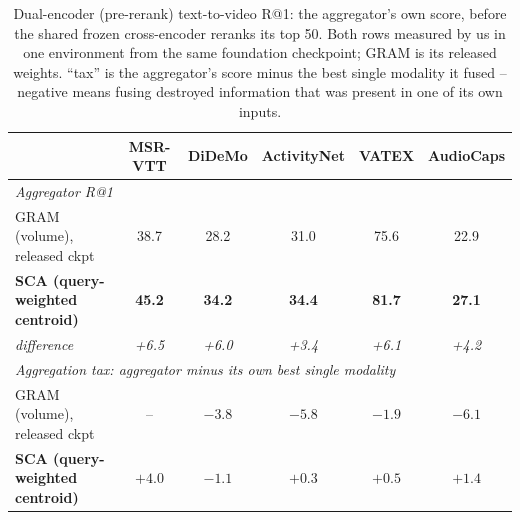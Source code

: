 \begin{table}[t]
\centering
\caption{Dual-encoder (pre-rerank) text-to-video R@1: the aggregator's own score, before the
shared frozen cross-encoder reranks its top 50. Both rows measured by us in one environment
from the same foundation checkpoint; GRAM is its released weights. ``tax'' is the aggregator's
score minus the best single modality it fused -- negative means fusing destroyed information
that was present in one of its own inputs.}
\label{tab:aggregator}
\small
\setlength{\tabcolsep}{5pt}
\begin{tabular}{lccccc}
\toprule
& MSR-VTT & DiDeMo & ActivityNet & VATEX & AudioCaps \\
\midrule
\multicolumn{6}{l}{\emph{Aggregator R@1}} \\
GRAM (volume), released ckpt & 38.7 & 28.2 & 31.0 & 75.6 & 22.9 \\
\textbf{SCA (query-weighted centroid)} & \textbf{45.2} & \textbf{34.2} & \textbf{34.4} & \textbf{81.7} & \textbf{27.1} \\
\emph{difference} & \emph{+6.5} & \emph{+6.0} & \emph{+3.4} & \emph{+6.1} & \emph{+4.2} \\
\midrule
\multicolumn{6}{l}{\emph{Aggregation tax: aggregator minus its own best single modality}} \\
GRAM (volume), released ckpt & -- & $-3.8$ & $-5.8$ & $-1.9$ & $-6.1$ \\
\textbf{SCA (query-weighted centroid)} & $+4.0$ & $-1.1$ & $+0.3$ & $+0.5$ & $+1.4$ \\
\bottomrule
\end{tabular}
\end{table}

%
%
%
